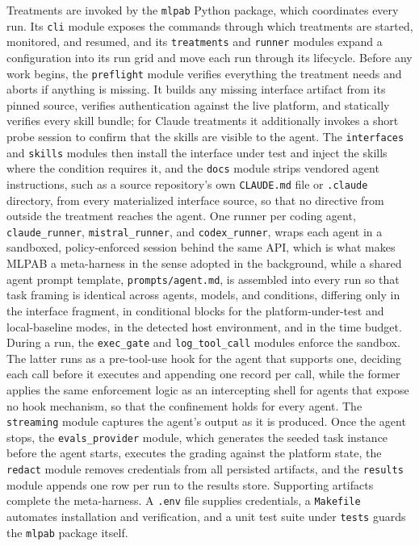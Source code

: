 \documentclass[
english,                 %
bibtex,                  %
]{kththesis}
\numberwithin{listing}{chapter}
\begin{document}
Treatments are invoked by the \texttt{mlpab} Python package, which coordinates every run. Its \texttt{cli} module exposes the commands through which treatments are started, monitored, and resumed, and its \texttt{treatments} and \texttt{runner} modules expand a configuration into its run grid and move each run through its lifecycle. Before any work begins, the \texttt{preflight} module verifies everything the treatment needs and aborts if anything is missing. It builds any missing interface artifact from its pinned source, verifies authentication against the live platform, and statically verifies every skill bundle; for Claude treatments it additionally invokes a short probe session to confirm that the skills are visible to the agent. The \texttt{interfaces} and \texttt{skills} modules then install the interface under test and inject the skills where the condition requires it, and the \texttt{docs} module strips vendored agent instructions, such as a source repository's own \texttt{CLAUDE.md} file or \texttt{.claude} directory, from every materialized interface source, so that no directive from outside the treatment reaches the agent. One runner per coding agent, \texttt{claude\_runner}, \texttt{mistral\_runner}, and \texttt{codex\_runner}, wraps each agent in a sandboxed, policy-enforced session behind the same \gls{API}, which is what makes \gls{MLPAB} a meta-harness in the sense adopted in the background, while a shared agent prompt template, \texttt{prompts/agent.md}, is assembled into every run so that task framing is identical across agents, models, and conditions, differing only in the interface fragment, in conditional blocks for the platform-under-test and local-baseline modes, in the detected host environment, and in the time budget. During a run, the \texttt{exec\_gate} and \texttt{log\_tool\_call} modules enforce the sandbox. The latter runs as a pre-tool-use hook for the agent that supports one, deciding each call before it executes and appending one record per call, while the former applies the same enforcement logic as an intercepting shell for agents that expose no hook mechanism, so that the confinement holds for every agent. The \texttt{streaming} module captures the agent's output as it is produced. Once the agent stops, the \texttt{evals\_provider} module, which generates the seeded task instance before the agent starts, executes the grading against the platform state, the \texttt{redact} module removes credentials from all persisted artifacts, and the \texttt{results} module appends one row per run to the results store. Supporting artifacts complete the meta-harness. A \texttt{.env} file supplies credentials, a \texttt{Makefile} automates installation and verification, and a unit test suite under \texttt{tests} guards the \texttt{mlpab} package itself.
\end{document}
